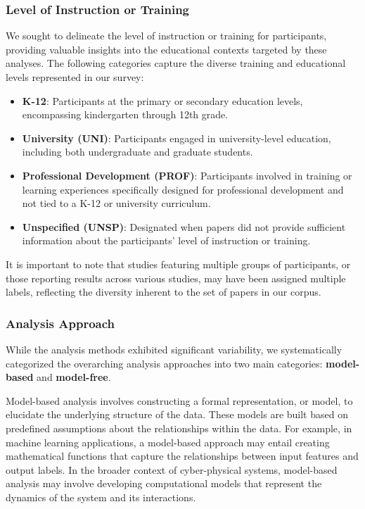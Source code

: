 \documentclass[manuscript,screen,review]{acmart}
\begin{document}
\subsubsection{Level of Instruction or Training} \label{subsec:level_of_instruction}
We sought to delineate the level of instruction or training for participants, providing valuable insights into the educational contexts targeted by these analyses. The following categories capture the diverse training and educational levels represented in our survey:

\begin{itemize}
    \item \textbf{K-12}: Participants at the primary or secondary education levels, encompassing kindergarten through 12th grade.
    \item \textbf{University (UNI)}: Participants engaged in university-level education, including both undergraduate and graduate students.
    \item \textbf{Professional Development (PROF)}: Participants involved in training or learning experiences specifically designed for professional development and not tied to a K-12 or university curriculum.
    \item \textbf{Unspecified (UNSP)}: Designated when papers did not provide sufficient information about the participants' level of instruction or training.
\end{itemize}

It is important to note that studies featuring multiple groups of participants, or those reporting results across various studies, may have been assigned multiple labels, reflecting the diversity inherent to the set of papers in our corpus.

\subsubsection{Analysis Approach} \label{subsec:analysis_approach}

While the analysis methods exhibited significant variability, we systematically categorized the overarching analysis approaches into two main categories: \textbf{model-based} and \textbf{model-free}.

Model-based analysis involves constructing a formal representation, or model, to elucidate the underlying structure of the data. These models are built based on predefined assumptions about the relationships within the data. For example, in machine learning applications, a model-based approach may entail creating mathematical functions that capture the relationships between input features and output labels. In the broader context of cyber-physical systems, model-based analysis may involve developing computational models that represent the dynamics of the system and its interactions.
\end{document}
